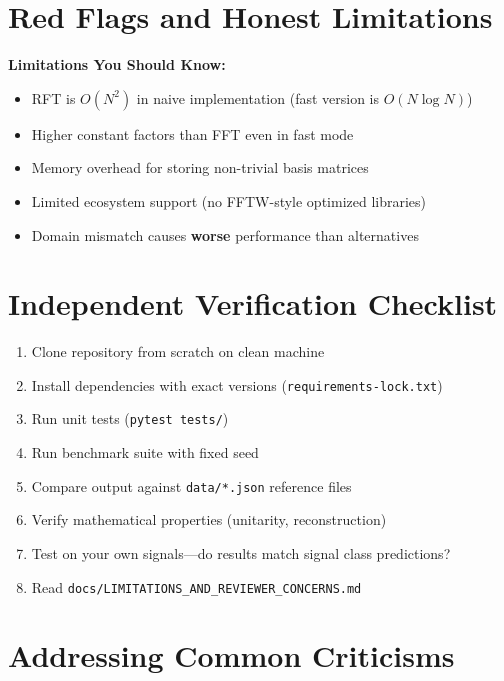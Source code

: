 \documentclass[11pt, a4paper, openany]{book}
\theoremstyle{definition}
\begin{document}
\section{Red Flags and Honest Limitations}

\begin{warningbox}
\textbf{Limitations You Should Know:}
\begin{itemize}
    \item RFT is $O(N^2)$ in naive implementation (fast version is $O(N\log N)$)
    \item Higher constant factors than FFT even in fast mode
    \item Memory overhead for storing non-trivial basis matrices
    \item Limited ecosystem support (no FFTW-style optimized libraries)
    \item Domain mismatch causes \textbf{worse} performance than alternatives
\end{itemize}
\end{warningbox}

\section{Independent Verification Checklist}
\begin{enumerate}
    \item[$\square$] Clone repository from scratch on clean machine
    \item[$\square$] Install dependencies with exact versions (\texttt{requirements-lock.txt})
    \item[$\square$] Run unit tests (\texttt{pytest tests/})
    \item[$\square$] Run benchmark suite with fixed seed
    \item[$\square$] Compare output against \texttt{data/*.json} reference files
    \item[$\square$] Verify mathematical properties (unitarity, reconstruction)
    \item[$\square$] Test on your own signals---do results match signal class predictions?
    \item[$\square$] Read \texttt{docs/LIMITATIONS\_AND\_REVIEWER\_CONCERNS.md}
\end{enumerate}

\section{Addressing Common Criticisms}
\end{document}
